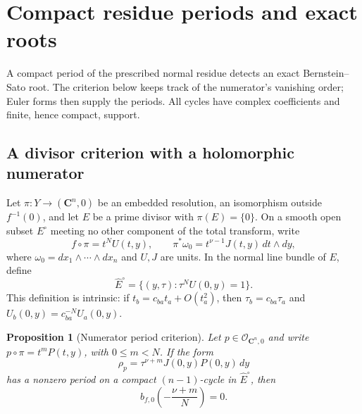 \documentclass[11pt]{article}
\numberwithin{equation}{section}
\newtheorem{proposition}[theorem]{Proposition}
\theoremstyle{definition}
\theoremstyle{remark}
\newcommand{\CC}{\mathbf C}
\newcommand{\OO}{\mathcal O}
\newcommand{\omegao}{\omega_0}
\begin{document}
\section{Compact residue periods and exact roots}\label{sec:periods}

A compact period of the prescribed normal residue detects
an exact Bernstein--Sato root. The criterion below keeps
track of the numerator's vanishing order; Euler forms then
supply the periods. All cycles have complex coefficients
and finite, hence compact, support.

\subsection{A divisor criterion with a holomorphic numerator}

Let $\pi:Y\to(\CC^n,0)$ be an embedded resolution, an
isomorphism outside $f^{-1}(0)$, and let $E$ be a prime divisor
with $\pi(E)=\{0\}$. On a smooth open subset $E^\circ$ meeting
no other component of the total transform, write
\begin{equation}\label{eq:divisor-model}
 f\circ\pi=t^NU(t,y),\qquad
 \pi^*\omegao=t^{\nu-1}J(t,y)\,dt\wedge dy,
\end{equation}
where $\omegao=dx_1\wedge\cdots\wedge dx_n$ and $U,J$ are
units. In the normal line bundle of $E$, define
\begin{equation}\label{eq:normal-cover}
 \widehat E^\circ=\{(y,\tau):\tau^NU(0,y)=1\}.
\end{equation}
This definition is intrinsic: if $t_b=c_{ba}t_a+O(t_a^2)$,
then $\tau_b=c_{ba}\tau_a$ and
$U_b(0,y)=c_{ba}^{-N}U_a(0,y)$.

\begin{proposition}[Numerator period criterion]\label{prop:criterion}
Let $p\in\OO_{\CC^n,0}$ and write
$p\circ\pi=t^mP(t,y)$, with $0\le m<N$. If the form
\begin{equation}\label{eq:specified-residue}
 \rho_p=\tau^{\nu+m}J(0,y)P(0,y)\,dy
\end{equation}
has a nonzero period on a compact $(n-1)$-cycle in
$\widehat E^\circ$, then
\begin{equation}\label{eq:criterion-root}
 b_{f,0}\!\left(-\frac{\nu+m}{N}\right)=0.
\end{equation}
\end{proposition}
\end{document}
